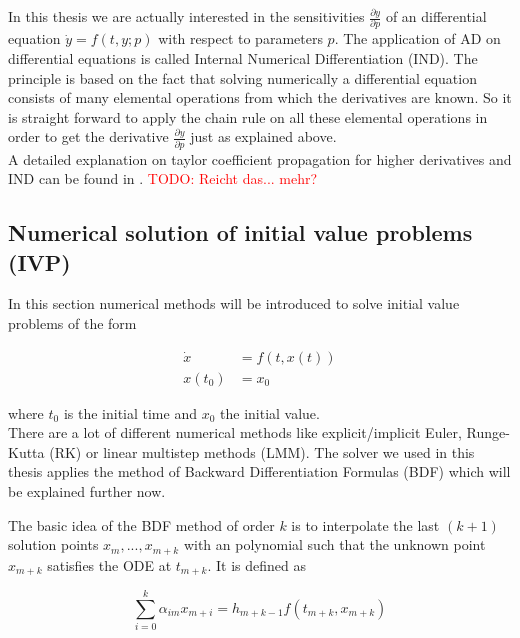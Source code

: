 \documentclass{scrartcl}[12pt, halfparskip]
\newcommand{\todo}[1]{\textcolor{red}{TODO: #1}}
\begin{document}
In this thesis we are actually interested in the sensitivities $\frac{\partial y}{\partial p}$ of an differential equation $\dot{y}=f(t,y;p)$ with respect to parameters $p$. The application of AD on differential equations is called Internal Numerical Differentiation (IND). The principle is based on the fact that solving numerically a differential equation consists of many elemental operations from which the derivatives are known. So it is straight forward to apply the chain rule on all these elemental operations in order to get the derivative $\frac{\partial y}{\partial p}$ just as explained above. \\
A detailed explanation on taylor coefficient propagation for higher derivatives and IND can be found in \cite{diss_jan}. \todo{Reicht das... mehr?}



\subsection{Numerical solution of initial value problems (IVP)}
In this section numerical methods will be introduced to solve initial value problems of the form

\begin{align}
	\dot{x} & = f(t,x(t)) \\
	x(t_0) & = x_0 \nonumber
\end{align}

where $t_0$ is the initial time and $x_0$ the initial value. \\

There are a lot of different numerical methods like explicit/implicit Euler, Runge-Kutta (RK) or linear multistep methods (LMM). The solver we used in this thesis applies the method of Backward Differentiation Formulas (BDF) which will be explained further now.

The basic idea of the BDF method of order $k$ is to interpolate the last $(k+1)$ solution points $x_m,...,x_{m+k}$ with an polynomial such that the unknown point $x_{m+k}$ satisfies the ODE at $t_{m+k}$. 
It is defined as

\begin{equation}
	\sum_{i=0}^{k} \alpha_{im} x_{m+i} = h_{m+k-1} f(t_{m+k},x_{m+k})
	\label{eq:bdf_formula}
\end{equation}
\end{document}
